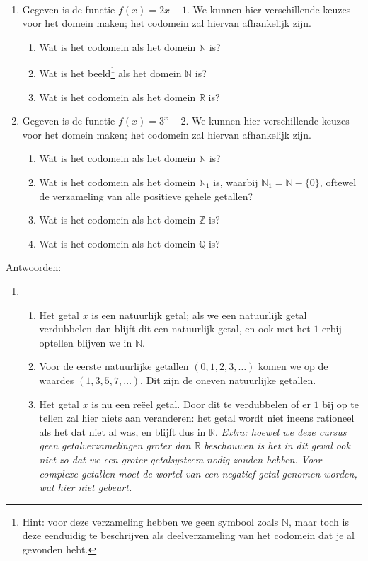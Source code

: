 \begin{answer}\mbox{}\\
  \begin{enumerate}[label=\textbf{\alph*.}]
    \item Gegeven is de functie $f(x) = 2x + 1$. We kunnen hier verschillende keuzes voor het domein maken; het codomein zal hiervan afhankelijk zijn.
      \begin{enumerate}
        \item Wat is het codomein als het domein $\mathbb{N}$ is?
        \item Wat is het beeld\footnote{Hint: voor deze verzameling hebben we geen symbool zoals $\mathbb{N}$, maar toch is deze eenduidig te beschrijven als deelverzameling van het codomein dat je al gevonden hebt.} als het domein $\mathbb{N}$ is?
        \item Wat is het codomein als het domein $\mathbb{R}$ is?
      \end{enumerate}

    \item Gegeven is de functie $f(x) = 3^{x} - 2$. We kunnen hier verschillende keuzes voor het domein maken; het codomein zal hiervan afhankelijk zijn.
      \begin{enumerate}
        \item Wat is het codomein als het domein $\mathbb{N}$ is?
        \item Wat is het codomein als het domein $\mathbb{N}_{1}$ is, waarbij $\mathbb{N}_{1} = \mathbb{N} - \{0\}$, oftewel de verzameling van alle positieve gehele getallen?
        \item Wat is het codomein als het domein $\mathbb{Z}$ is?
        \item Wat is het codomein als het domein $\mathbb{Q}$ is?
      \end{enumerate}


  \end{enumerate}

  Antwoorden:

  \begin{enumerate}[label=\textbf{\alph*.}]
    \item \begin{enumerate}
        \item Het getal $x$ is een natuurlijk getal; als we een natuurlijk getal verdubbelen dan blijft dit een natuurlijk getal, en ook met het $1$ erbij optellen blijven we in $\mathbb{N}$.
        \item Voor de eerste natuurlijke getallen $(0,1,2,3,\dots)$ komen we op de waardes $(1,3,5,7,\dots)$. Dit zijn de oneven natuurlijke getallen.
        \item Het getal $x$ is nu een re\"{e}el getal. Door dit te verdubbelen of er $1$ bij op te tellen zal hier niets aan veranderen: het getal wordt niet ineens rationeel als het dat niet al was, en blijft dus in $\mathbb{R}$. \emph{Extra: hoewel we deze cursus geen getalverzamelingen groter dan $\mathbb{R}$ beschouwen is het in dit geval ook niet zo dat we een groter getalsysteem nodig zouden hebben. Voor complexe getallen moet de wortel van een negatief getal genomen worden, wat hier niet gebeurt.}
      \end{enumerate}



\end{enumerate}
\end{answer}
